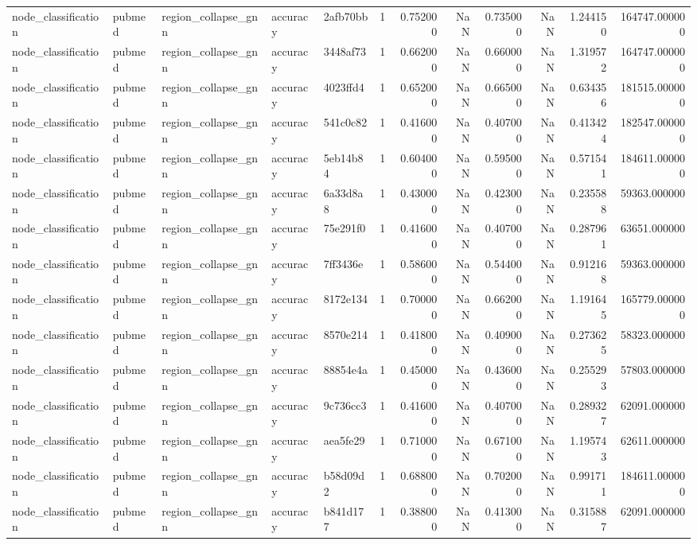 \begin{tabular}{lllllrrrrrrr}
node_classification & pubmed & region_collapse_gnn & accuracy & 2afb70bb & 1 & 0.752000 & NaN & 0.735000 & NaN & 1.244150 & 164747.000000 \\
node_classification & pubmed & region_collapse_gnn & accuracy & 3448af73 & 1 & 0.662000 & NaN & 0.660000 & NaN & 1.319572 & 164747.000000 \\
node_classification & pubmed & region_collapse_gnn & accuracy & 4023ffd4 & 1 & 0.652000 & NaN & 0.665000 & NaN & 0.634356 & 181515.000000 \\
node_classification & pubmed & region_collapse_gnn & accuracy & 541c0c82 & 1 & 0.416000 & NaN & 0.407000 & NaN & 0.413424 & 182547.000000 \\
node_classification & pubmed & region_collapse_gnn & accuracy & 5eb14b84 & 1 & 0.604000 & NaN & 0.595000 & NaN & 0.571541 & 184611.000000 \\
node_classification & pubmed & region_collapse_gnn & accuracy & 6a33d8a8 & 1 & 0.430000 & NaN & 0.423000 & NaN & 0.235588 & 59363.000000 \\
node_classification & pubmed & region_collapse_gnn & accuracy & 75e291f0 & 1 & 0.416000 & NaN & 0.407000 & NaN & 0.287961 & 63651.000000 \\
node_classification & pubmed & region_collapse_gnn & accuracy & 7ff3436e & 1 & 0.586000 & NaN & 0.544000 & NaN & 0.912168 & 59363.000000 \\
node_classification & pubmed & region_collapse_gnn & accuracy & 8172e134 & 1 & 0.700000 & NaN & 0.662000 & NaN & 1.191645 & 165779.000000 \\
node_classification & pubmed & region_collapse_gnn & accuracy & 8570e214 & 1 & 0.418000 & NaN & 0.409000 & NaN & 0.273625 & 58323.000000 \\
node_classification & pubmed & region_collapse_gnn & accuracy & 88854e4a & 1 & 0.450000 & NaN & 0.436000 & NaN & 0.255293 & 57803.000000 \\
node_classification & pubmed & region_collapse_gnn & accuracy & 9c736cc3 & 1 & 0.416000 & NaN & 0.407000 & NaN & 0.289327 & 62091.000000 \\
node_classification & pubmed & region_collapse_gnn & accuracy & aea5fe29 & 1 & 0.710000 & NaN & 0.671000 & NaN & 1.195743 & 62611.000000 \\
node_classification & pubmed & region_collapse_gnn & accuracy & b58d09d2 & 1 & 0.688000 & NaN & 0.702000 & NaN & 0.991711 & 184611.000000 \\
node_classification & pubmed & region_collapse_gnn & accuracy & b841d177 & 1 & 0.388000 & NaN & 0.413000 & NaN & 0.315887 & 62091.000000 \\

\end{tabular}

